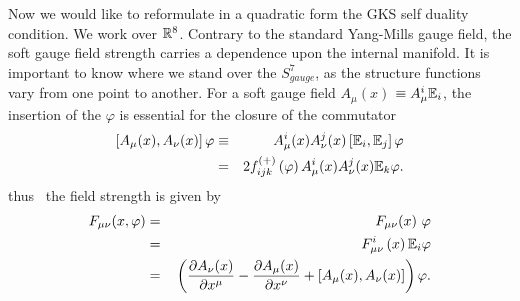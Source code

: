 \documentclass[a4paper,12pt]{book}
\begin{document}
Now we would like to reformulate in a quadratic form the GKS self duality
condition. We work over $\Bbb{R}^{8}$. Contrary to the standard Yang-Mills
gauge field, the soft gauge field strength carries a dependence upon the
internal manifold. It is important to know where we stand over the $%
S_{gauge}^{7}$, as the structure functions vary from one point to another.
For a soft gauge field $A_{\mu }(x)$ $\equiv A_{\mu }^{i}\Bbb{E}_{i}$, the
insertion of the $\varphi $ is essential for the closure of the commutator 
\begin{eqnarray}
\left[ A_{\mu }(x),A_{\nu }(x)\right] \varphi &\equiv &A_{\mu }^{i}(x)A_{\nu
}^{j}(x)\left[ \Bbb{E}_{i},\Bbb{E}_{j}\right] \varphi \\
&=&2f_{ijk}^{\left( +\right) }\left( \varphi \right) A_{\mu }^{i}(x)A_{\nu
}^{j}(x)\Bbb{E}_{k}\varphi .
\end{eqnarray}
thus \ the field strength is given by 
\begin{eqnarray}
F_{\mu \nu }(x,{\varphi }) &=&F_{\mu \nu }(x){\ \varphi }  \nonumber \\
&=&F_{\mu \nu }^{i}\left( x\right) \Bbb{E}_{i}\varphi  \nonumber \\
{} &=&{}\left( \frac{\partial A_{\nu }(x)}{\partial x^{\mu }}-\frac{\partial
A_{\mu }(x)}{\partial x^{\nu }}+\left[ A_{\mu }(x),A_{\nu }(x)\right]
\right) {\varphi }.  \label{fmn}
\end{eqnarray}
\end{document}
